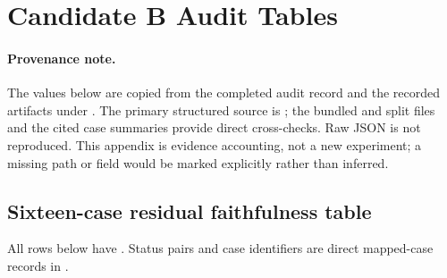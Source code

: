 \section{Candidate B Audit Tables}
\label{app:audit}

\paragraph{Provenance note.}
The values below are copied from the completed audit record
 and the recorded
artifacts under
.  The primary
structured source is ; the bundled and split
 files and the cited case summaries provide direct
cross-checks.  Raw JSON is not reproduced.  This appendix is evidence
accounting, not a new experiment; a missing path or field would be marked
explicitly rather than inferred.

\subsection{Sixteen-case residual faithfulness table}

All rows below have .  Status pairs and case identifiers
are direct mapped-case records in .

